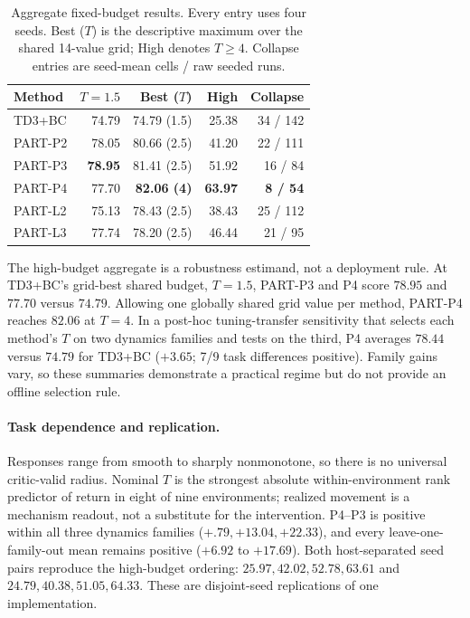 \documentclass[twoside]{article}
\begin{document}
\begin{table}[t]
\caption{Aggregate fixed-budget results. Every entry uses four seeds. Best
($T$) is the descriptive maximum over the shared 14-value grid; High denotes
$T\ge4$. Collapse entries are seed-mean cells / raw seeded runs.}
\centering
\small
\setlength{\tabcolsep}{3pt}
\begin{tabular}{lrrrr}
\toprule
Method & $T=1.5$ & Best ($T$) & High & Collapse\\
\midrule
TD3+BC & 74.79 & 74.79 (1.5) & 25.38 & 34 / 142\\
PART-P2 & 78.05 & 80.66 (2.5) & 41.20 & 22 / 111\\
PART-P3 & \textbf{78.95} & 81.41 (2.5) & 51.92 & 16 / 84\\
PART-P4 & 77.70 & \textbf{82.06 (4)} & \textbf{63.97} & \textbf{8 / 54}\\
PART-L2 & 75.13 & 78.43 (2.5) & 38.43 & 25 / 112\\
PART-L3 & 77.74 & 78.20 (2.5) & 46.44 & 21 / 95\\
\bottomrule
\end{tabular}
\label{tab:stability}
\end{table}

The high-budget aggregate is a robustness estimand, not a deployment rule.
At TD3+BC's grid-best shared budget, $T=1.5$, PART-P3 and P4 score $78.95$
and $77.70$ versus $74.79$. Allowing one globally shared grid value per
method, PART-P4 reaches $82.06$ at $T=4$. In a post-hoc tuning-transfer
sensitivity that selects each method's $T$ on two dynamics families and tests
on the third, P4 averages $78.44$ versus $74.79$ for TD3+BC ($+3.65$; 7/9
task differences positive). Family gains vary, so these summaries demonstrate
a practical regime but do not provide an offline selection rule.

\paragraph{Task dependence and replication.}
Responses range from smooth to sharply nonmonotone, so there is no universal
critic-valid radius. Nominal $T$ is the strongest absolute within-environment
rank predictor of return in eight of nine environments; realized movement is
a mechanism readout, not a substitute for the intervention. P4--P3 is positive
within all three dynamics families ($+.79,+13.04,+22.33$), and every
leave-one-family-out mean remains positive ($+6.92$ to $+17.69$). Both
host-separated seed pairs reproduce the high-budget ordering:
$25.97,42.02,52.78,63.61$ and $24.79,40.38,51.05,64.33$. These are disjoint-seed
replications of one implementation.
\end{document}

